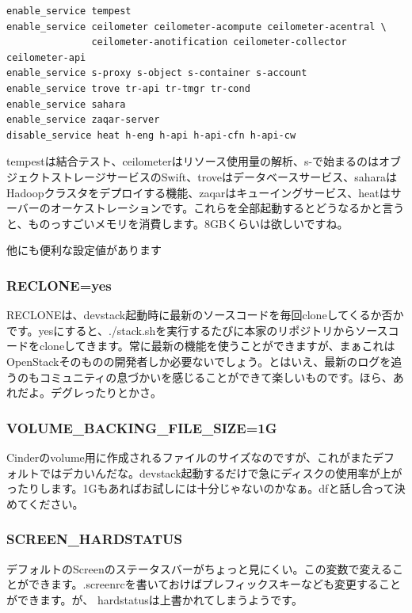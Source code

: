 \documentclass[9pt,b5paper,tombo,openany,dvipdfmx]{jsbook}
\begin{document}
\begin{lstlisting}
enable_service tempest
enable_service ceilometer ceilometer-acompute ceilometer-acentral \
               ceilometer-anotification ceilometer-collector ceilometer-api
enable_service s-proxy s-object s-container s-account
enable_service trove tr-api tr-tmgr tr-cond
enable_service sahara
enable_service zaqar-server
disable_service heat h-eng h-api h-api-cfn h-api-cw
\end{lstlisting}

tempestは結合テスト、ceilometerはリソース使用量の解析、s-で始まるのはオブジェクトストレージサービスのSwift、troveはデータベースサービス、saharaはHadoopクラスタをデプロイする機能、zaqarはキューイングサービス、heatはサーバーのオーケストレーションです。これらを全部起動するとどうなるかと言うと、ものっすごいメモリを消費します。8GBくらいは欲しいですね。

他にも便利な設定値があります

\subsubsection{RECLONE=yes}

RECLONEは、devstack起動時に最新のソースコードを毎回cloneしてくるか否かです。yesにすると、./stack.shを実行するたびに本家のリポジトリからソースコードをcloneしてきます。常に最新の機能を使うことができますが、まぁこれはOpenStackそのものの開発者しか必要ないでしょう。とはいえ、最新のログを追うのもコミュニティの息づかいを感じることができて楽しいものです。ほら、あれだよ。デグレったりとかさ。

\subsubsection{VOLUME\_BACKING\_FILE\_SIZE=1G}

Cinderのvolume用に作成されるファイルのサイズなのですが、これがまたデフォルトではデカいんだな。devstack起動するだけで急にディスクの使用率が上がったりします。1Gもあればお試しには十分じゃないのかなぁ。dfと話し合って決めてください。

\subsubsection{SCREEN\_HARDSTATUS}

デフォルトのScreenのステータスバーがちょっと見にくい。この変数で変えることができます。.screenrcを書いておけばプレフィックスキーなども変更することができます。が、 hardstatusは上書かれてしまうようです。
\end{document}
